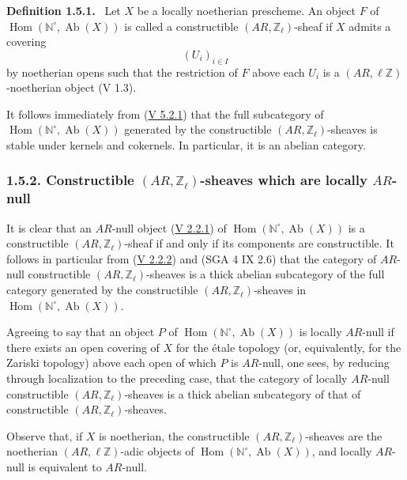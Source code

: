 \documentclass[11pt]{article}
\newenvironment{statement}[1]{\par\medskip\noindent\textbf{#1.}\ }{\par\medskip}
\DeclareMathOperator{\Hom}{Hom}
\providecommand{\Hom}{\operatorname{Hom}}
\providecommand{\Ab}{\operatorname{Ab}}
\providecommand{\Ab}{\operatorname{Ab}}
\providecommand{\Hom}{\operatorname{Hom}}
\begin{document}
\label{sga5:VI:definition:1.5.1}\begin{statement}{Definition 1.5.1}
Let \(X\) be a locally noetherian prescheme. An object \(F\) of \(\Hom(\mathbb N^\circ,\Ab(X))\) is called a constructible \((AR,\mathbb Z_\ell)\)-sheaf if \(X\) admits a covering
\[
(U_i)_{i\in I}
\]
by noetherian opens such that the restriction of \(F\) above each \(U_i\) is a \((AR,\ell\mathbb Z)\)-noetherian object (V 1.3).
\end{statement}

It follows immediately from (\hyperref[sga5:V:proposition:5.2.1]{V 5.2.1}) that the full subcategory of \(\Hom(\mathbb N^\circ,\Ab(X))\) generated by the constructible \((AR,\mathbb Z_\ell)\)-sheaves is stable under kernels and cokernels. In particular, it is an abelian category.

\subsubsection*{1.5.2. Constructible \((AR,\mathbb Z_\ell)\)-sheaves which are locally \(AR\)-null}\label{sga5:VI:subsubsection:1.5.2}

It is clear that an \(AR\)-null object (\hyperref[sga5:V:definition:2.2.1]{V 2.2.1}) of \(\Hom(\mathbb N^\circ,\Ab(X))\) is a constructible \((AR,\mathbb Z_\ell)\)-sheaf if and only if its components are constructible. It follows in particular from (\hyperref[sga5:V:proposition:2.2.2]{V 2.2.2}) and (SGA 4 IX 2.6) that the category of \(AR\)-null constructible \((AR,\mathbb Z_\ell)\)-sheaves is a thick abelian subcategory of the full category generated by the constructible \((AR,\mathbb Z_\ell)\)-sheaves in \(\Hom(\mathbb N^\circ,\Ab(X))\).

Agreeing to say that an object \(P\) of \(\Hom(\mathbb N^\circ,\Ab(X))\) is locally \(AR\)-null if there exists an open covering of \(X\) for the étale topology (or, equivalently, for the Zariski topology) above each open of which \(P\) is \(AR\)-null, one sees, by reducing through localization to the preceding case, that the category of locally \(AR\)-null constructible \((AR,\mathbb Z_\ell)\)-sheaves is a thick abelian subcategory of that of constructible \((AR,\mathbb Z_\ell)\)-sheaves.

Observe that, if \(X\) is noetherian, the constructible \((AR,\mathbb Z_\ell)\)-sheaves are the noetherian \((AR,\ell\mathbb Z)\)-adic objects of \(\Hom(\mathbb N^\circ,\Ab(X))\), and locally \(AR\)-null is equivalent to \(AR\)-null.
\end{document}
